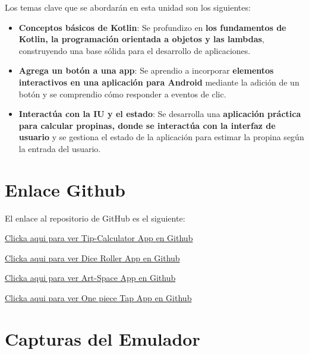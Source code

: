 \documentclass[a4paper]{article}
\begin{document}
    Los temas clave que se abordarán en esta unidad son los siguientes:
    
    \begin{itemize}
      \item \textbf{Conceptos básicos de Kotlin}:
      Se profundizo en \textbf{los fundamentos de Kotlin, la programación orientada a objetos y las lambdas}, construyendo una base sólida para el desarrollo de aplicaciones.
    
      \item \textbf{Agrega un botón a una app}:
      Se aprendio a incorporar \textbf{elementos interactivos en una aplicación para Android} mediante la adición de un botón y se comprendio cómo responder a eventos de clic.
    
      \item \textbf{Interactúa con la IU y el estado}:
      Se desarrolla una \textbf{aplicación práctica para calcular propinas, donde se interactúa con la interfaz de usuario} y se gestiona el estado de la aplicación para estimar la propina según la entrada del usuario.
    \end{itemize}

    
    \section{Enlace Github}
    El enlace al repositorio de GitHub es el siguiente:\vspace{0.3cm}
    
    \href{https://github.com/AlejandroDavidArzolaSaavedra/Tip-Calculator}{Clicka aqui para ver Tip-Calculator App en Github}\vspace{0.3cm}
    
     \href{https://github.com/AlejandroDavidArzolaSaavedra/Dice-Roller-App}{Clicka aqui para ver Dice Roller App  en Github}\vspace{0.3cm}

    \href{https://github.com/AlejandroDavidArzolaSaavedra/Art-Space}{Clicka aqui para ver Art-Space App en Github}\vspace{0.3cm}

    \href{https://github.com/AlejandroDavidArzolaSaavedra/One-Piece-Tap-App}{Clicka aqui para ver One piece Tap App en Github}\vspace{0.3cm}

    \section{Capturas del Emulador}
\end{document}
